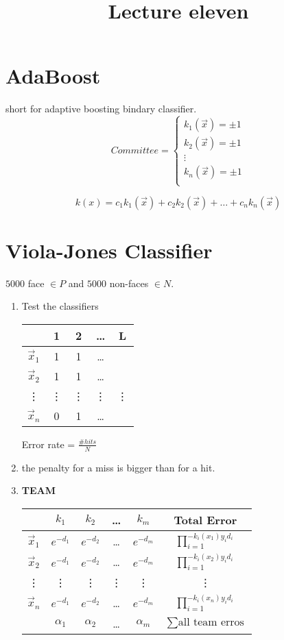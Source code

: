 \documentclass[letterpaper, 9pt]{article}
\title{Lecture eleven}
\begin{document}
\maketitle
\section{AdaBoost}

short for adaptive boosting bindary classifier.
\begin{equation}Committee =
\begin{cases}
k_1(\vec{x}) = \pm1 \\
k_2(\vec{x}) = \pm1 \\
\vdots \\
k_n(\vec{x}) = \pm1 \\
\end{cases}
\end{equation}

\begin{equation}
k(x) = c_1k_1(\vec{x}) + c_2k_2(\vec{x}) + \dots + c_nk_n(\vec{x})
\end{equation}

\section{Viola-Jones Classifier}
$5000$ face $\in P$ and $5000$ non-faces $\in N$.

\begin{enumerate}
\item Test the classifiers
\begin{tabular}{c|cccc}
~ & 1 & 2 & \dots & L \\ \hline
$\vec{x}_1$ & 1 & 1 & \dots & ~ \\
$\vec{x}_2$ & 1 & 1 & \dots & ~ \\
\vdots & \vdots & \vdots & \vdots & \vdots \\
$\vec{x}_n$ & 0 & 1 & \dots & ~ \\
\end{tabular}
Error rate = $\frac{\# hits}{N}$
\item the penalty for a miss is bigger than for a hit.
\item \textbf{TEAM} \\
\begin{tabular}{c|cccc|c}
~ & $k_1$ & $k_2$ & \dots & $k_m$ & Total Error\\ \hline
$\vec{x}_1$ & $e^{-d_1}$ & $e^{-d_2}$ & \dots & $e^{-d_m}$ & $\prod_{i=1}^{-k_i(x_1)y_id_i}$ \\
$\vec{x}_2$ & $e^{-d_1}$ & $e^{-d_2}$ & \dots & $e^{-d_m}$ & $\prod_{i=1}^{-k_i(x_2)y_id_i}$ \\
\vdots & \vdots & \vdots & \vdots & \vdots & \vdots \\
$\vec{x}_n$ & $e^{-d_1}$ & $e^{-d_2}$ & \dots & $e^{-d_m}$ & $\prod_{i=1}^{-k_i(x_n)y_id_i}$ \\ \hline
~ & $\alpha_1$ & $\alpha_2$ & \dots & $\alpha_m$ & $\sum \text{all team erros}$
\end{tabular}
\end{enumerate}
\end{document}
